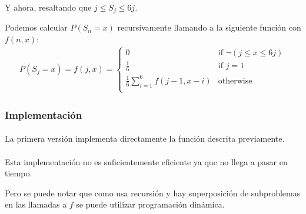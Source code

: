 \documentclass[../main.tex]{subfiles}
\begin{document}
Y ahora, resaltando que \(j \leq S_{j} \leq 6j\).

Podemos calcular \(P(S_{n} = x)\) recursivamente llamando a la siguiente función con \(f(n, x)\):
\begin{gather*}
  P(S_{j} = x) = f(j, x) = \begin{cases}
    0 & \text{if } \neg(j \leq x \leq 6j) \\
    \frac{1}{6} & \text{if } j = 1 \\
    \frac{1}{6}\sum_{i = 1}^{6}f(j-1, x-i) & \text{otherwise} \\
  \end{cases}
\end{gather*}

\subsubsection{Implementación}

\paragraph{} La primera versión implementa directamente la función descrita previamente.


\paragraph{} Esta implementación no es suficientemente eficiente ya que no llega a pasar en tiempo.

Pero se puede notar que como usa recursión y hay superposición de subproblemas en las llamadas a \(f\) se puede utilizar programación dinámica.

\end{document}
